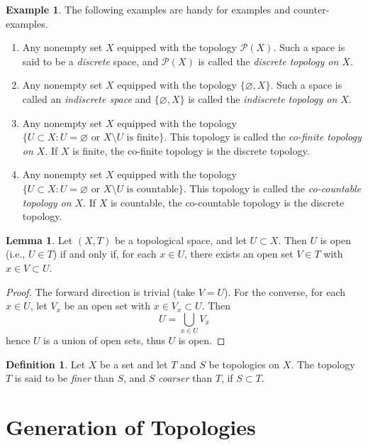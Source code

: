 \documentclass{book}
\theoremstyle{definition}
\newtheorem{lemma}[theorem]{Lemma}
\newtheorem{definition}{Definition}[section]
\newtheorem{example}{Example}[section]
\theoremstyle{remark}
\begin{document}
\begin{example}
The following examples are handy for examples and counter-examples.
\begin{enumerate}
    \item Any nonempty set $X$ equipped with the topology $\mathcal P(X)$. Such a space is said to be a \textit{discrete} space, and $\mathcal P(X)$ is called the \textit{discrete topology on $X$}.
    \item Any nonempty set $X$ equipped with the topology $\{\varnothing, X\}$. Such a space is called an \textit{indiscrete space} and $\{\varnothing, X\}$ is called the \textit{indiscrete topology on $X$}.
    \item Any nonempty set $X$ equipped with the topology $\{U\subset X:U=\varnothing\text{ or }X\setminus U\text{ is finite}\}$. This topology is called the \textit{co-finite topology on $X$}. If $X$ is finite, the co-finite topology is the discrete topology.
    \item Any nonempty set $X$ equipped with the topology $\{U\subset X:U=\varnothing\text{ or }X\setminus U\text{ is countable}\}$. This topology is called the \textit{co-countable topology on $X$}. If $X$ is countable, the co-countable topology is the discrete topology.
\end{enumerate}
\end{example}

\begin{lemma}
\label{openchar}
Let $(X,T)$ be a topological space, and let $U\subset X$. Then $U$ is open (i.e., $U\in T$) if and only if, for each $x\in U$, there exists an open set $V\in T$ with $x\in V\subset U$.
\end{lemma}
\begin{proof}
The forward direction is trivial (take $V=U$). For the converse, for each $x\in U$, let $V_x$ be an open set with $x\in V_x\subset U$. Then
$$U=\bigcup_{x\in U} V_x$$
hence $U$ is a union of open sets, thus $U$ is open.
\end{proof}

\begin{definition}
Let $X$ be a set and let $T$ and $S$ be topologies on $X$. The topology $T$ is said to be \textit{finer} than $S$, and $S$ \textit{coarser} than $T$, if $S\subset T$.
\end{definition}

\section{Generation of Topologies}
\end{document}
